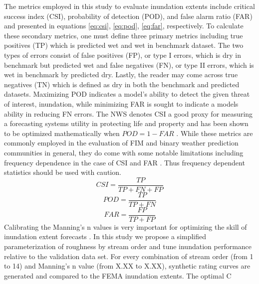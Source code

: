 The metrics employed in this study to evaluate inundation extents include critical success index (CSI), probability of detection (POD), and false alarm ratio (FAR) and presented in equations \ref{eq:csi}, \ref{eq:pod}, \ref{eq:far}, respectively.
To calculate these secondary metrics, one must define three primary metrics including true positives (TP) which is predicted wet and wet in benchmark dataset.
The two types of errors consist of false positives (FP), or type I errors, which is dry in benchmark but predicted wet and false negatives (FN), or type II errors, which is wet in benchmark by predicted dry. 
Lastly, the reader may come across true negatives (TN) which is defined as dry in both the benchmark and predicted datasets.
Maximizing POD indicates a model's ability to detect the given threat of interest, inundation, while minimizing FAR is sought to indicate a models ability in reducing FN errors.
The NWS denotes CSI a good proxy for measuring a forecasting systems utility in protecting life and property and has been shown to be optimized mathematically when $POD = 1 - FAR$ \cite{gerapetritis2004behavior}.
While these metrics are commonly employed in the evaluation of FIM and binary weather prediction communities in general, they do come with some notable limitations including frequency dependence in the case of CSI and FAR \cite{gerapetritis2004behavior,stephens2014problems,schaefer1990critical,jolliffe2012forecast}.
Thus frequency dependent statistics should be used with caution. 
%
\begin{equation}
\label{eq:csi}
CSI = \frac{TP}{TP + FN + FP}
\end{equation}
%
\begin{equation}
\label{eq:pod}
POD = \frac{TP}{TP + FN}
\end{equation}
%
\begin{equation}
\label{eq:far}
FAR = \frac{FP}{TP + FP}
\end{equation}
%
Calibrating the Manning's n values is very important for optimizing the skill of inundation extent forecasts \cite{zheng2018river,garousi2019terrain}.
 In this study we propose a simplified parameterization of roughness by stream order and tune inundation performance relative to the validation data set.
For every combination of stream order (from 1 to 14) and Manning's n value (from X.XX to X.XX), synthetic rating curves are generated and compared to the FEMA inundation extents.
The optimal C
%
